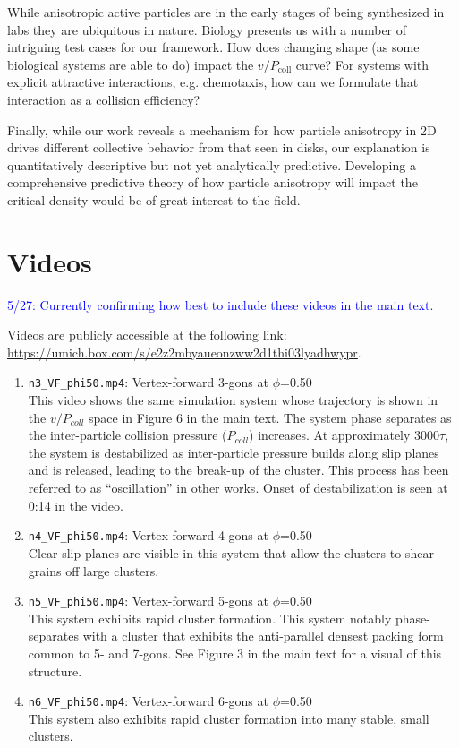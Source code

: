 While anisotropic active particles are in the early stages of being synthesized in labs they are ubiquitous in nature.
Biology presents us with a number of intriguing test cases for our framework.
How does changing shape (as some biological systems are able to do) impact the $v/P_\text{coll}$ curve?
For systems with explicit attractive interactions, e.g. chemotaxis, how can we formulate that interaction as a collision efficiency?

Finally, while our work reveals a mechanism for how particle anisotropy in 2D drives different collective behavior from that seen in disks, our explanation is quantitatively descriptive but not yet analytically predictive.
Developing a comprehensive predictive theory of how particle anisotropy will impact the critical density would be of great interest to the field.

\section{Videos}

\textcolor{blue}{5/27: Currently confirming how best to include these videos in the main text.}

Videos are publicly accessible at the following link: \\
\href{https://umich.box.com/s/e2z2mbyaueonzww2d1thi03lyadhwypr}{https://umich.box.com/s/e2z2mbyaueonzww2d1thi03lyadhwypr}.

\begin{enumerate}
  \item \verb|n3_VF_phi50.mp4|: Vertex-forward 3-gons at $\phi$=0.50 \\
  This video shows the same simulation system whose trajectory is shown in the $v/P_{coll}$ space in Figure 6 in the main text. The system phase separates as the inter-particle collision pressure ($P_{coll}$) increases. At approximately 3000$\tau$, the system is destabilized as inter-particle pressure builds along slip planes and is released, leading to the break-up of the cluster. This process has been referred to as “oscillation” in other works. Onset of destabilization is seen at 0:14 in the video.
  \item \verb|n4_VF_phi50.mp4|: Vertex-forward 4-gons at $\phi$=0.50 \\
  Clear slip planes are visible in this system that allow the clusters to shear grains off large clusters.
  \item \verb|n5_VF_phi50.mp4|: Vertex-forward 5-gons at $\phi$=0.50 \\
  This system exhibits rapid cluster formation. This system notably phase-separates with a cluster that exhibits the anti-parallel densest packing form common to 5- and 7-gons. See Figure 3 in the main text for a visual of this structure.
  \item \verb|n6_VF_phi50.mp4|: Vertex-forward 6-gons at $\phi$=0.50 \\
  This system also exhibits rapid cluster formation into many stable, small clusters.
\end{enumerate}
